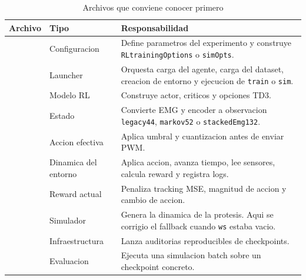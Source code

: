 \documentclass[11pt,a4paper]{article}
\begin{document}
\begin{table}[H]
\centering
\caption{Archivos que conviene conocer primero}
\scriptsize
\setlength{\tabcolsep}{4pt}
\begin{tabularx}{\linewidth}{>{\raggedright\arraybackslash}p{3.4cm} >{\raggedright\arraybackslash}p{2.8cm} Y}
\toprule
Archivo & Tipo & Responsabilidad \\
\midrule
{} & Configuracion & Define parametros del experimento y construye \texttt{RLtrainingOptions} o \texttt{simOpts}. \\
 & Launcher & Orquesta carga del agente, carga del dataset, creacion de entorno y ejecucion de \texttt{train} o \texttt{sim}. \\
 & Modelo RL & Construye actor, criticos y opciones TD3. \\
 & Estado & Convierte EMG y encoder a observacion \texttt{legacy44}, \texttt{markov52} o \texttt{stackedEmg132}. \\
 & Accion efectiva & Aplica umbral y cuantizacion antes de enviar PWM. \\
 & Dinamica del entorno & Aplica accion, avanza tiempo, lee sensores, calcula reward y registra logs. \\
 & Reward actual & Penaliza tracking MSE, magnitud de accion y cambio de accion. \\
 & Simulador & Genera la dinamica de la protesis. Aqui se corrigio el fallback cuando \texttt{ws} estaba vacio. \\
 & Infraestructura & Lanza auditorias reproducibles de checkpoints. \\
 & Evaluacion & Ejecuta una simulacion batch sobre un checkpoint concreto. \\
\bottomrule
\end{tabularx}
\normalsize
\end{table}
\end{document}

